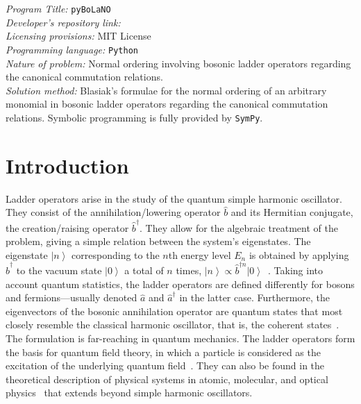 \documentclass[5p, twocolumn, 10pt, sort&compress]{elsarticle}
\newcommand{\ket}[1]{\left|{#1}\right\rangle}
\newcommand{\bop}{\hat{b}}
\newcommand{\bdag}{\bop^\dagger}
\newenvironment{revision}{}{}
\begin{document}


\begin{small}
\noindent
{\em Program Title:} \texttt{pyBoLaNO}
\\
{\em Developer's repository link:} \href{https://github.com/hendry24/pyBoLaNO}{}
\\
{\em Licensing provisions:} MIT License
\\
{\em Programming language:} \texttt{Python}
\\
{\em Nature of problem:} Normal ordering involving bosonic ladder operators \begin{revision} regarding the canonical commutation relations. \end{revision}
\\
{\em Solution method:} Blasiak's formulae for the normal ordering of an arbitrary monomial in bosonic ladder operators \begin{revision}regarding the canonical commutation relations.\end{revision} Symbolic programming is fully provided by \texttt{SymPy}.
\end{small}


\section{Introduction}
\label{Introduction}

Ladder operators arise in the study of the quantum simple harmonic oscillator. They consist of the annihilation/lowering operator $\bop$ and its Hermitian conjugate, the creation/raising operator $\bdag$. They allow for the algebraic treatment of the problem, giving a simple relation between the system's eigenstates. The eigenstate $\ket{n}$ corresponding to the $n$th energy level $E_n$ is obtained by applying $\hat{b}^\dagger$ to the vacuum state $\ket{0}$ a total of $n$ times, $\ket{n}\propto\hat{b}^{\dagger n}\ket{0}$~\cite{griffiths_introduction_2018, lancaster_quantum_2014}. Taking into account quantum statistics, the ladder operators are defined differently for bosons and fermions---usually denoted $\hat{a}$ and $\hat{a}^\dagger$ in the latter case. Furthermore, the eigenvectors of the bosonic annihilation operator are quantum states that most closely resemble the classical harmonic oscillator, that is, the coherent states~\cite{gerry_introductory_2005}. The formulation is far-reaching in quantum mechanics. The ladder operators form the basis for quantum field theory, in which a particle is considered as the excitation of the underlying quantum field~\cite{lancaster_quantum_2014}. They can also be found in the theoretical description of physical systems in atomic, molecular, and optical physics~\cite{gerry_introductory_2005} that extends beyond simple harmonic oscillators.
\end{document}
